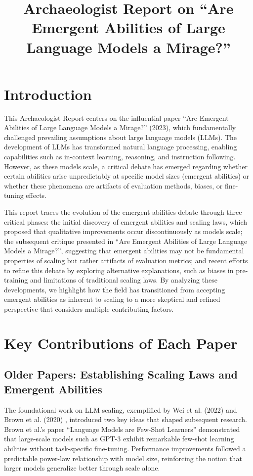 \documentclass[10pt,a4paper]{article}
\title{\textbf{Archaeologist Report on ``Are Emergent Abilities of Large Language Models a Mirage?''}}
\author{}
\date{}
\begin{document}
\maketitle
\thispagestyle{fancy}

\section{Introduction}
This Archaeologist Report centers on the influential paper ``Are Emergent Abilities of Large Language Models a Mirage?'' (2023), which fundamentally challenged prevailing assumptions about large language models (LLMs). The development of LLMs has transformed natural language processing, enabling capabilities such as in-context learning, reasoning, and instruction following. However, as these models scale, a critical debate has emerged regarding whether certain abilities arise unpredictably at specific model sizes (emergent abilities) or whether these phenomena are artifacts of evaluation methods, biases, or fine-tuning effects.

This report traces the evolution of the emergent abilities debate through three critical phases: the initial discovery of emergent abilities and scaling laws, which proposed that qualitative improvements occur discontinuously as models scale; the subsequent critique presented in ``Are Emergent Abilities of Large Language Models a Mirage?'', suggesting that emergent abilities may not be fundamental properties of scaling but rather artifacts of evaluation metrics; and recent efforts to refine this debate by exploring alternative explanations, such as biases in pre-training and limitations of traditional scaling laws. By analyzing these developments, we highlight how the field has transitioned from accepting emergent abilities as inherent to scaling to a more skeptical and refined perspective that considers multiple contributing factors.

\section{Key Contributions of Each Paper}

\subsection{Older Papers: Establishing Scaling Laws and Emergent Abilities}
The foundational work on LLM scaling, exemplified by Wei et al. (2022) \citep{wei2022emergent} and Brown et al. (2020) \citep{brown2020language}, introduced two key ideas that shaped subsequent research. Brown et al.'s paper ``Language Models are Few-Shot Learners'' demonstrated that large-scale models such as GPT-3 exhibit remarkable few-shot learning abilities without task-specific fine-tuning. Performance improvements followed a predictable power-law relationship with model size, reinforcing the notion that larger models generalize better through scale alone.
\end{document}
